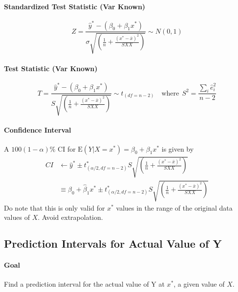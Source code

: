 \documentclass[10pt]{article}
\begin{document}
\paragraph{Standardized Test Statistic (Var Known)}
\begin{equation*}
    Z=\frac{\hat{y}^{*}-\left(\beta_{0}+\beta_{1} x^{*}\right)}{\sigma \sqrt{\left(\frac{1}{n}+\frac{\left(x^{*}-\bar{x}\right)^{2}}{S X X}\right)}} \sim N(0,1)
\end{equation*}

\paragraph{Test Statistic (Var Known)}
\begin{equation*}
    T=\frac{\hat{y}^*-\left(\beta_{0}+\beta_{1} x^{*}\right)}{S \sqrt{\left(\frac{1}{n}+\frac{\left(x^{*}-\bar{x}\right)^{2}}{S X X}\right)}} \sim t_{(df=n-2)} \quad \text{where}~~S^2 = \frac{\sum_i \hat{e}_i^2}{n-2} 
\end{equation*}

\paragraph{Confidence Interval} A $100 (1 - \alpha) \%$ CI for $\mathrm{E}\left(Y | X=x^{*}\right)=\beta_{0}+\beta_{1} x^{*}$ is given by
\begin{align*}
    CI &\gets \hat{y}^{*} \pm t^\ast_{(\alpha / 2, df = n-2)} S \sqrt{\left(\frac{1}{n}+\frac{\left(x^{*}-\bar{x}\right)^{2}}{S X X}\right)} \\
    &\equiv \hat{\beta}_{0}+\hat{\beta}_{1} x^{*} \pm t^\ast_{(\alpha / 2, df =n-2)} S \sqrt{\left(\frac{1}{n}+\frac{\left(x^{*}-\bar{x}\right)^{2}}{S X X}\right)}
\end{align*}
\color{Thistle} 
Do note that this is only valid for $x^\ast$ values in the range of the original data values of $X$. Avoid extrapolation.
\color{Black}

\subsection{Prediction Intervals for Actual Value of Y}
\paragraph{Goal} Find a prediction interval for the actual value of Y at $x^*$, a given value of $X$.
\end{document}
